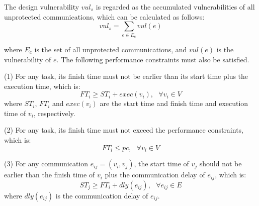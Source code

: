\documentclass[10pt,journal, compsoc]{IEEEtran}
\begin{document}
The design vulnerability $vul_s$ is regarded as the accumulated vulnerabilities of all unprotected communications, which can be calculated as follows:
\begin{equation}
vul_s=\sum \limits_{e\in E_c}vul(e)
\end{equation}

\noindent where $E_c$ is the set of all unprotected communications, and $vul(e)$ is the vulnerability of $e$. The following performance constraints must also be satisfied.





(1) For any task, its finish time must not be earlier than its start time plus the execution time, which is:
\begin{equation}
	FT_i \geq ST_i + exec(v_i), ~~~\forall v_i \in V
\end{equation}
where $ST_i$, $FT_i$ and $exec(v_i)$ are the start time and finish time and execution time of $v_i$, respectively.

(2) For any task, its finish time must not exceed the performance constraints, which is:
\begin{equation}
FT_i \leq pc,~~~ \forall v_i \in V
\end{equation}

(3) For any communication $e_{ij}=(v_i, v_j)$, the start time of $v_j$ should not be earlier than the finish time of $v_i$ plus the communication delay of $e_{ij}$, which is:
\begin{equation}
	ST_j \geq FT_i + dly(e_{ij}), ~~~\forall e_{ij} \in E
\end{equation}
where $dly(e_{ij})$ is the communication delay of $e_{ij}$.







\end{document}
